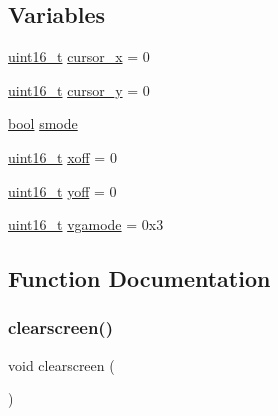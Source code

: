 \subsection*{Variables}
\begin{DoxyCompactItemize}
\item 
\hyperlink{a00140_a273cf69d639a59973b6019625df33e30_a273cf69d639a59973b6019625df33e30}{uint16\+\_\+t} \hyperlink{a00179_ae69604af0f9bd5fca2a016d0aa1ba7e1_ae69604af0f9bd5fca2a016d0aa1ba7e1}{cursor\+\_\+x} = 0
\item 
\hyperlink{a00140_a273cf69d639a59973b6019625df33e30_a273cf69d639a59973b6019625df33e30}{uint16\+\_\+t} \hyperlink{a00179_a0301c5492919c401c2c1ecf52af709b0_a0301c5492919c401c2c1ecf52af709b0}{cursor\+\_\+y} = 0
\item 
\hyperlink{a00140_af6a258d8f3ee5206d682d799316314b1_af6a258d8f3ee5206d682d799316314b1}{bool} \hyperlink{a00179_a22b8d30f7aee33f172c1239aed53e7db_a22b8d30f7aee33f172c1239aed53e7db}{smode}
\item 
\hyperlink{a00140_a273cf69d639a59973b6019625df33e30_a273cf69d639a59973b6019625df33e30}{uint16\+\_\+t} \hyperlink{a00179_abaa0d20f0e52ce0d3a7d706f6ac16266_abaa0d20f0e52ce0d3a7d706f6ac16266}{xoff} = 0
\item 
\hyperlink{a00140_a273cf69d639a59973b6019625df33e30_a273cf69d639a59973b6019625df33e30}{uint16\+\_\+t} \hyperlink{a00179_a1a7539764d0ae8cd06ce45c62cf92bca_a1a7539764d0ae8cd06ce45c62cf92bca}{yoff} = 0
\item 
\hyperlink{a00140_a273cf69d639a59973b6019625df33e30_a273cf69d639a59973b6019625df33e30}{uint16\+\_\+t} \hyperlink{a00179_af93b0649fdd1bea5b6d29ed37205aa2c_af93b0649fdd1bea5b6d29ed37205aa2c}{vgamode} = 0x3
\end{DoxyCompactItemize}


\subsection{Function Documentation}
\mbox{\label{a00179_aff4bc17c602603d120756f52e18ebb96_aff4bc17c602603d120756f52e18ebb96}} 
\subsubsection{\texorpdfstring{clearscreen()}{clearscreen()}}
{\footnotesize\ttfamily void clearscreen (\begin{DoxyParamCaption}{ }\end{DoxyParamCaption})}



